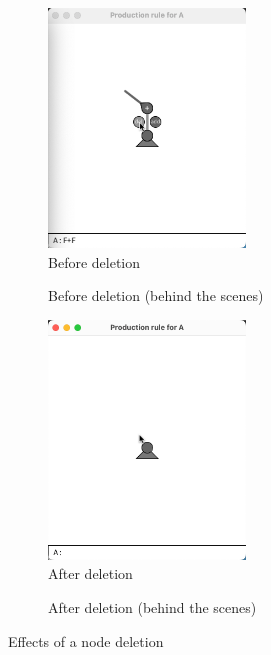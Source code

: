 \documentclass[12pt,twoside]{reedthesis}
\begin{document}
	
	\begin{figure}[h]
	\centering
	\begin{subfigure}{0.5\textwidth}
		\centering
		\includegraphics[height = 2.5in]{Images/HowItWorks7A}
		\caption{Before deletion}
		\label {HowItWorks7A}
	\end{subfigure}%
	\begin{subfigure}{0.5\textwidth}
		\centering
		\caption{Before deletion (behind the scenes)}
	\end{subfigure}
	\begin{subfigure}{0.5\textwidth}
		\centering
		\includegraphics[height = 2.5in]{Images/HowItWorks7C}
		\caption{After deletion}
		\label {HowItWorks7C}
	\end{subfigure}%
	\begin{subfigure}{0.5\textwidth}
		\centering
		\caption{After deletion (behind the scenes)}
	\end{subfigure}
	\caption{Effects of a node deletion}
	\label{NodeDeletion}
	\end{figure}
	
\end{document}
